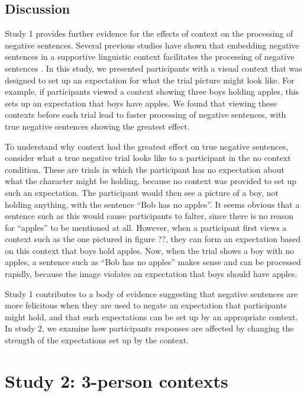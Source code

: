 \documentclass[man]{apa2}
\begin{document}
\subsection{Discussion}

Study 1 provides further evidence for the effects of context on the processing of negative sentences.  Several previous studies have shown that embedding negative sentences in a supportive linguistic context facilitates the processing of negative sentences \cite{dale2011, glenberg1999, ludtke2006}.  In this study, we presented participants with a visual context that was designed to set up an expectation for what the trial picture might look like.  For example, if participants viewed a context showing three boys holding apples, this sets up an expectation that boys have apples.  We found that viewing these contexts before each trial lead to faster processing of negative sentences, with true negative sentences showing the greatest effect.  

To understand why context had the greatest effect on true negative sentences, consider what a true negative trial looks like to a participant in the no context condition.  These are trials in which the participant has no expectation about what the character might be holding, because no context was provided to set up such an expectation.  The participant would then see a picture of a boy, not holding anything, with the sentence ``Bob has no apples''.  It seems obvious that a sentence such as this would cause participants to falter, since there is no reason for ``apples'' to be mentioned at all.  However, when a participant first views a context such as the one pictured in figure ??, they can form an expectation based on this context that boys hold apples.  Now, when the trial shows a boy with no apples, a sentence such as ``Bob has no apples'' makes sense and can be processed rapidly, because the image violates an expectation that boys should have apples.  

Study 1 contributes to a body of evidence suggesting that negative sentences are more felicitous when they are used to negate an expectation that participants might hold, and that such expectations can be set up by an appropriate context.  In study 2, we examine how participants responses are affected by changing the strength of the expectations set up by the context.  

\section{Study 2: 3-person contexts}
\end{document}
